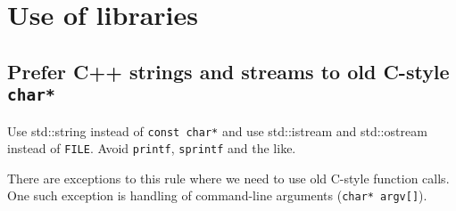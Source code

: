\section{Use of libraries}

\subsection{Prefer C++ strings and streams to old C-style \texttt{char*}}

Use std::string instead of \texttt{const char*} and use std::istream and
std::ostream instead of \texttt{FILE}. Avoid \texttt{printf},
\texttt{sprintf} and the like.

There are exceptions to this rule where we need to use old C-style
function calls. One such exception is handling of command-line
arguments (\texttt{char* argv[]}).
